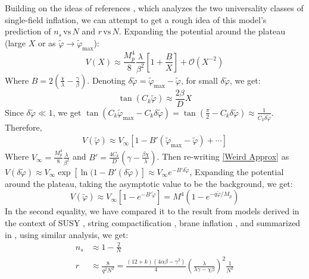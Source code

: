 \documentclass[aps,prd,reprint,preprintnumbers,showpacs,floatfix,nofootinbib,superscript address]{revtex4-2}
\begin{document}
Building on the ideas of references \cite{fairbairn_radion_2003, roest_universality_2014}, which analyzes the two universality classes of single-field inflation, we can attempt to get a rough idea of this model's prediction of $n_s \, \text{vs} \, N$ and $r \, \text{vs} \, N$.
Expanding the potential around the plateau (large $X$ or as $\tilde{\varphi} \rightarrow \tilde{\varphi}_{\text{max}}$):
\begin{equation}
    V(X) \approx \frac{M_p^4}{8} \frac{\lambda}{\beta^2}\left[1 + \frac{B}{X}\right] + \mathcal{O}(X^{-2})
\end{equation}
Where $B = 2(\frac{\chi}{\lambda} - \frac{\gamma}{\beta})$. Denoting $\delta \tilde{\varphi} =  \tilde{\varphi}_{\text{max}} - \tilde{\varphi}$, for small $\delta \tilde{\varphi}$, we get:
\begin{equation}
    \tan(C_k \tilde{\varphi}) \approx \frac{2\beta}{D}X
\end{equation}
Since $\delta \tilde{\varphi} \ll 1$, we get $\tan(C_k \tilde{\varphi}_{\text{max}} - C_k\delta\tilde{\varphi}) = \tan(\frac{\pi}{2} - C_k\delta\tilde{\varphi}) \approx \frac{1}{C_k \delta \tilde{\varphi}}$. Therefore, 
\begin{align} \label{Weird Approx}
    V(\tilde{\varphi}) \approx V_{\infty}[1 - B'(\tilde{\varphi}_{\text{max}} - \tilde{\varphi}) + \cdots]
\end{align}
Where $V_\infty = \frac{M_p^4}{8} \frac{\lambda}{\beta^2}$ and $B' = \frac{4C_k}{D} (\gamma-\frac{\beta\chi}{\lambda})$. Then re-writing \cref{Weird Approx} as $V(\delta\tilde{\varphi}) \approx V_{\infty} \exp{[\ln(1 - B'(\delta \tilde{\varphi})]} \approx V_\infty e^{-B'\delta \tilde{\varphi}}$, Expanding the potential around the plateau, taking the asymptotic value to be the background, we get:
\begin{equation}
    V(\tilde{\varphi}) \approx V_\infty [1 - e^{-B' \tilde{\varphi}} ] = M^4 (1 - e^{-q\tilde{\varphi}/M_p})
\end{equation}
In the second equality, we have compared it to the result from models derived in the context of SUSY \cite{stewart_inflation_1995}, string compactification \cite{cicoli_fibre_2009}, brane inflation \cite{dvali_brane_1999}, and summarized in \cite{martin_encyclopaedia_2014}, using similar analysis, we get:
\begin{align}
    n_s &\approx 1 - \frac{2}{N} \\
    r &\approx \frac{8}{q^2N^2} = \frac{(12+k)(4\alpha\beta - \gamma^2)}{4} \left(\frac{\lambda}{\lambda \gamma - \chi \beta} \right)^2 \frac{1}{N^2} 
\end{align}
\end{document}

